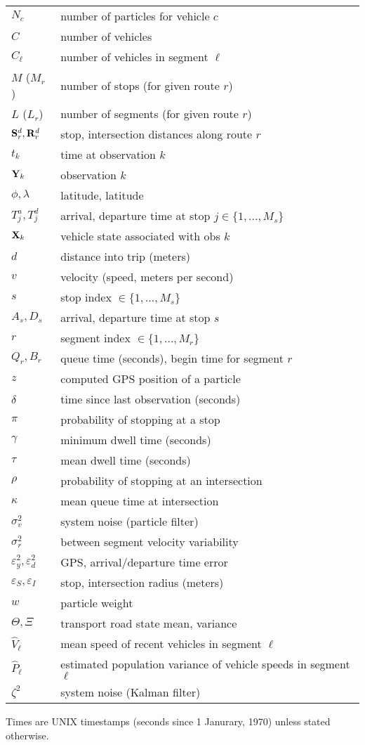 \documentclass[draftcls,a4paper,onecolumn]{IEEEtran}\usepackage[]{graphicx}\usepackage[]{color}
\begin{document}
\begin{tabular}{ll}
  $N_c$ & number of particles for vehicle $c$ \\
  $C$ & number of vehicles \\
  $C_\ell$ & number of vehicles in segment $\ell$ \\
  $M$ ($M_r$) & number of stops (for given route $r$) \\
  $L$ ($L_r$) & number of segments (for given route $r$) \\
  $\mathbf{S}^d_r, \mathbf{R}^d_r$ & stop, intersection distances along route $r$ \\
  $t_k$ & time at observation $k$ \\
  $\mathbf{Y}_k$ & observation $k$ \\
  $\phi,\lambda$ & latitude, latitude \\
  $T^a_j, T^d_j$ & arrival, departure time at stop $j \in \{1, \ldots, M_s\}$ \\
  $\mathbf{X}_k$ & vehicle state associated with obs $k$ \\
  $d$ & distance into trip (meters) \\
  $v$ & velocity (speed, meters per second) \\
  $s$ & stop index $\in \{1, \ldots, M_s\}$ \\
  $A_s, D_s$ & arrival, departure time at stop $s$ \\
  $r$ & segment index $\in \{1, \ldots, M_r\}$ \\
  $Q_r, B_r$ & queue time (seconds), begin time for segment $r$ \\
  $z$ & computed GPS position of a particle \\
  $\delta$ & time since last observation (seconds) \\
  $\pi$ & probability of stopping at a stop \\
  $\gamma$ & minimum dwell time (seconds) \\
  $\tau$ & mean dwell time (seconds) \\
  $\rho$ & probability of stopping at an intersection \\
  $\kappa$ & mean queue time at intersection \\
  $\sigma_v^2$ & system noise (particle filter) \\
  $\sigma_r^2$ & between segment velocity variability \\
  $\varepsilon_y^2, \varepsilon_d^2$ & GPS, arrival/departure time error \\
  $\varepsilon_S, \varepsilon_I$ & stop, intersection radius (meters) \\
  $w$ & particle weight \\
  $\Theta, \Xi$ & transport road state mean, variance \\
  $\hat V_\ell$ & mean speed of recent vehicles in segment $\ell$ \\
  $\hat P_\ell$ & estimated population variance of vehicle speeds in segment $\ell$ \\
  $\zeta^2$ & system noise (Kalman filter)
\end{tabular}

\vspace{1em}
Times are UNIX timestamps (seconds since 1 Janurary, 1970) unless stated otherwise.
\end{document}
